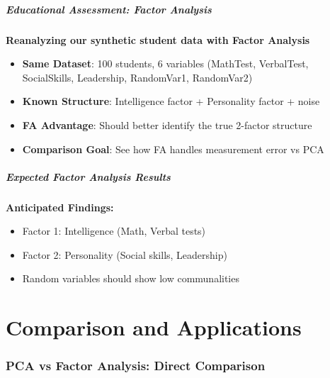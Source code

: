 \documentclass[aspectratio=169]{beamer}
\begin{document}
\begin{frame}
    \frametitle{Educational Assessment: Factor Analysis}
    \textbf{Reanalyzing our synthetic student data with Factor Analysis}
    \begin{itemize}
        \item \textbf{Same Dataset}: 100 students, 6 variables (MathTest, VerbalTest, SocialSkills, Leadership, RandomVar1, RandomVar2) \pause
        \item \textbf{Known Structure}: Intelligence factor + Personality factor + noise \pause
        \item \textbf{FA Advantage}: Should better identify the true 2-factor structure \pause
        \item \textbf{Comparison Goal}: See how FA handles measurement error vs PCA
    \end{itemize}
\end{frame}

\begin{frame}
    \frametitle{Expected Factor Analysis Results}
    \textbf{Anticipated Findings:}
    \begin{itemize}
        \item Factor 1: Intelligence (Math, Verbal tests) \pause
        \item Factor 2: Personality (Social skills, Leadership) \pause
        \item Random variables should show low communalities \pause
    \end{itemize}
\end{frame}



\part{Comparison and Applications}

\begin{frame}
    \partpage
\end{frame}

\section{PCA vs Factor Analysis: Direct Comparison}
\end{document}
